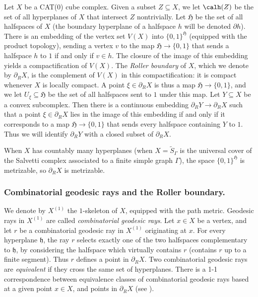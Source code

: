 Let $X$ be a CAT(0) cube complex. Given a subset $Z\subseteq X$, we let $\calh(Z)$ be the set of all hyperplanes of $X$ that intersect $Z$ nontrivially. Let $\mathfrak{H}$ be the set of all halfspaces of $X$ (the boundary hyperplane of a halfspace $h$ will be denoted $\partial h$). There is an embedding of the vertex set $V(X)$ into $\{0,1\}^{\mathfrak{H}}$ (equipped with the product topology), sending a vertex $v$ to the map $\mathfrak{H}\to\{0,1\}$ that sends a halfspace $h$ to $1$ if and only if $v\in h$. The closure of the image of this embedding yields a compactification of $V(X)$. The \emph{Roller boundary} of $X$, which we denote by $\partial_RX$, is the complement of $V(X)$ in this compactification: it is compact whenever $X$ is locally compact. A point $\xi\in\partial_R X$ is thus a map $\mathfrak{H}\to\{0,1\}$, and we let $U_\xi\subseteq\mathfrak{H}$ be the set of all halfspaces sent to $1$ under this map. Let $Y\subseteq X$ be a convex subcomplex. Then there is a continuous embedding $\partial_RY\to \partial_R X$ such that a point $\xi\in\partial_R X$ lies in the image of this embedding if and only if it corresponds to a map $\mathfrak{H}\to\{0,1\}$ that sends every halfspace containing $Y$ to $1$. Thus we will identify $\partial_R Y$ with a closed subset of $\partial_R X$.

When $X$ has countably many hyperplanes (\eg when $X=\widetilde{S}_\Gamma$ is the universal cover of the Salvetti complex associated to a finite simple graph $\Gamma$), the space $\{0,1\}^{\mathfrak{H}}$ is metrizable, so $\partial_RX$ is metrizable.

\subsubsection*{Combinatorial geodesic rays and the Roller boundary.} We denote by $X^{(1)}$ the $1$\nobreakdash-skele\-ton of $X$, equipped with the path metric. Geodesic rays in $X^{(1)}$ are called \emph{combinatorial geodesic rays}. Let $x\in X$ be a vertex, and let $r$ be a combinatorial geodesic ray in $X^{(1)}$ originating at $x$. For every hyperplane $\mathfrak{h}$, the ray $r$ selects exactly one of the two halfspaces complementary to $\mathfrak{h}$, by considering the halfspace which virtually contains $r$ (\ie contains $r$ up to a finite segment). Thus $r$ defines a point in $\partial_R X$. Two combinatorial geodesic rays are \emph{equivalent} if they cross the same set of hyperplanes. There is a 1-1 correspondence between equivalence classes of combinatorial geodesic rays based at a given point $x\in X$, and points in $\partial_R X$ (see \eg \cite[\S A.2]{genevois2020contracting}).


